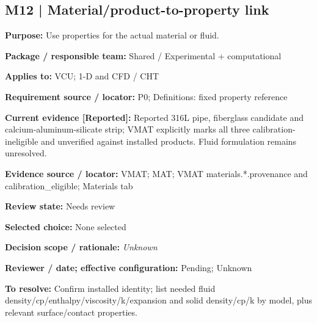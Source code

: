 \documentclass[11pt]{article}
\begin{document}
\par\noindent\begin{minipage}{\textwidth}\small\setlength{\parskip}{2pt}
\subsection*{M12 | Material/product-to-property link}
\textbf{Purpose:} Use properties for the actual material or fluid.\par
\textbf{Package / responsible team:} Shared / Experimental + computational\par
\textbf{Applies to:} VCU; 1-D and CFD / CHT\par
\textbf{Requirement source / locator:} P0; Definitions: fixed property reference\par
\textbf{Current evidence [Reported]:} Reported 316L pipe, fiberglass candidate and calcium-aluminum-silicate strip; VMAT explicitly marks all three calibration-ineligible and unverified against installed products. Fluid formulation remains unresolved.\par
\textbf{Evidence source / locator:} VMAT; MAT; VMAT materials.*.provenance and calibration\_\allowbreak{}eligible; Materials tab\par
\textbf{Review state:} Needs review\par
\textbf{Selected choice:} None selected\par
\textbf{Decision scope / rationale:} \textit{Unknown}\par
\textbf{Reviewer / date; effective configuration:} Pending; Unknown\par
\textbf{To resolve:} Confirm installed identity; list needed fluid density/cp/enthalpy/viscosity/k/expansion and solid density/cp/k by model, plus relevant surface/contact properties.\par
\end{minipage}\par\vspace{5pt}
\end{document}
